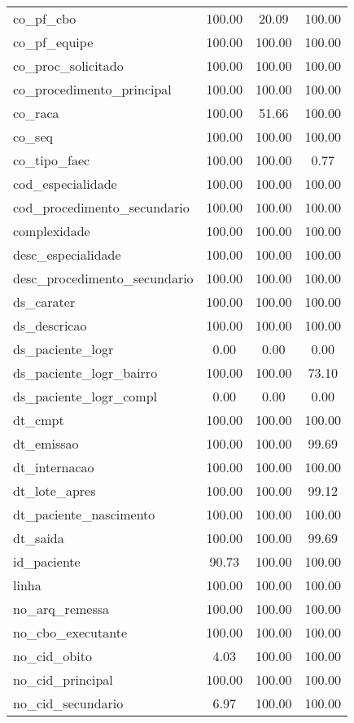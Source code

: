 \documentclass[
  12,
  table]{proadi}
\begin{document}
\begin{longtable}{lccc}
co\_pf\_cbo & 100.00 & 20.09 & 100.00\\
\addlinespace
co\_pf\_equipe & 100.00 & 100.00 & 100.00\\
co\_proc\_solicitado & 100.00 & 100.00 & 100.00\\
co\_procedimento\_principal & 100.00 & 100.00 & 100.00\\
co\_raca & 100.00 & 51.66 & 100.00\\
co\_seq & 100.00 & 100.00 & 100.00\\
\addlinespace
co\_tipo\_faec & 100.00 & 100.00 & 0.77\\
cod\_especialidade & 100.00 & 100.00 & 100.00\\
cod\_procedimento\_secundario & 100.00 & 100.00 & 100.00\\
complexidade & 100.00 & 100.00 & 100.00\\
desc\_especialidade & 100.00 & 100.00 & 100.00\\
\addlinespace
desc\_procedimento\_secundario & 100.00 & 100.00 & 100.00\\
ds\_carater & 100.00 & 100.00 & 100.00\\
ds\_descricao & 100.00 & 100.00 & 100.00\\
ds\_paciente\_logr & 0.00 & 0.00 & 0.00\\
ds\_paciente\_logr\_bairro & 100.00 & 100.00 & 73.10\\
\addlinespace
ds\_paciente\_logr\_compl & 0.00 & 0.00 & 0.00\\
dt\_cmpt & 100.00 & 100.00 & 100.00\\
dt\_emissao & 100.00 & 100.00 & 99.69\\
dt\_internacao & 100.00 & 100.00 & 100.00\\
dt\_lote\_apres & 100.00 & 100.00 & 99.12\\
\addlinespace
dt\_paciente\_nascimento & 100.00 & 100.00 & 100.00\\
dt\_saida & 100.00 & 100.00 & 99.69\\
id\_paciente & 90.73 & 100.00 & 100.00\\
linha & 100.00 & 100.00 & 100.00\\
no\_arq\_remessa & 100.00 & 100.00 & 100.00\\
\addlinespace
no\_cbo\_executante & 100.00 & 100.00 & 100.00\\
no\_cid\_obito & 4.03 & 100.00 & 100.00\\
no\_cid\_principal & 100.00 & 100.00 & 100.00\\
no\_cid\_secundario & 6.97 & 100.00 & 100.00\\

\end{longtable}
\end{document}
